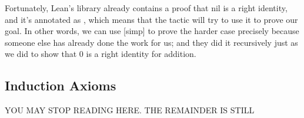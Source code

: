 \documentclass[letterpaper,10pt,english]{sphinxmanual}
\begin{document}
\sphinxAtStartPar
Fortunately, Lean’s library already contains a proof that
nil is a right identity, and it’s annotated as \sphinxstyleemphasis{{[}simp{]}},
which means that the  tactic will try to use it to
prove our goal. In other words, we can use {[}simp{]} to prove
the harder case precisely because someone else has already
done the work for us; and they did it recursively just as
we did to show that 0 is a right identity for addition.

\begin{sphinxVerbatim}[commandchars=\\\{\}]
                
 
    
 \PYG{o}{[}\PYG{o}{]}   
 \PYG{o}{[}\PYG{o}{]}   

          
            
            
\end{sphinxVerbatim}


\subsection{Induction Axioms}
\label{\detokenize{A_03_Recursive_Types:induction-axioms}}
\sphinxAtStartPar
YOU MAY STOP READING HERE. THE REMAINDER IS STILL 
\end{document}
